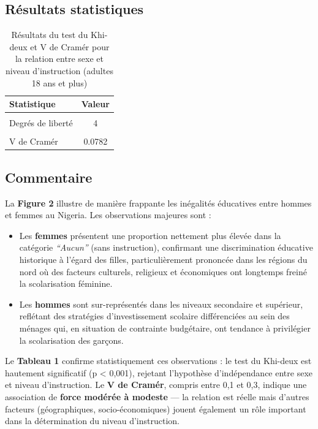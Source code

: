 \documentclass[
  11pt,
]{article}
\providecommand{\tightlist}{%
  \setlength{\itemsep}{0pt}\setlength{\parskip}{0pt}}
\begin{document}
\subsection{Résultats statistiques}\label{ruxe9sultats-statistiques}

\begingroup\fontsize{10}{12}\selectfont

\begin{longtable}[t]{lc}
\caption{\label{tab:task9-stats}Résultats du test du Khi-deux et V de Cramér pour la relation entre sexe et niveau d'instruction (adultes 18 ans et plus)}\\
\toprule
Statistique & Valeur\\
\midrule
\cellcolor{gray!10}{Khi-deux (χ²)} & \cellcolor{gray!10}{81.944}\\
Degrés de liberté & 4\\
\cellcolor{gray!10}{p-valeur} & \cellcolor{gray!10}{<0.001}\\
V de Cramér & 0.0782\\
\bottomrule
\end{longtable}
\endgroup{}

\subsection{Commentaire}\label{commentaire-1}

La \textbf{Figure 2} illustre de manière frappante les inégalités
éducatives entre hommes et femmes au Nigeria. Les observations majeures
sont :

\begin{itemize}
\tightlist
\item
  Les \textbf{femmes} présentent une proportion nettement plus élevée
  dans la catégorie \emph{``Aucun''} (sans instruction), confirmant une
  discrimination éducative historique à l'égard des filles,
  particulièrement prononcée dans les régions du nord où des facteurs
  culturels, religieux et économiques ont longtemps freiné la
  scolarisation féminine.
\item
  Les \textbf{hommes} sont sur-représentés dans les niveaux secondaire
  et supérieur, reflétant des stratégies d'investissement scolaire
  différenciées au sein des ménages qui, en situation de contrainte
  budgétaire, ont tendance à privilégier la scolarisation des garçons.
\end{itemize}

Le \textbf{Tableau 1} confirme statistiquement ces observations : le
test du Khi-deux est hautement significatif (p \textless{} 0,001),
rejetant l'hypothèse d'indépendance entre sexe et niveau d'instruction.
Le \textbf{V de Cramér}, compris entre 0,1 et 0,3, indique une
association de \textbf{force modérée à modeste} --- la relation est
réelle mais d'autres facteurs (géographiques, socio-économiques) jouent
également un rôle important dans la détermination du niveau
d'instruction.
\end{document}
